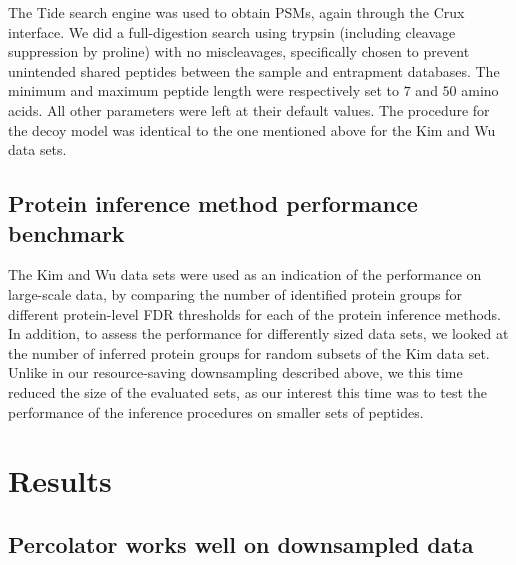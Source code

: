 \documentclass{article}
\begin{document}

The Tide search engine was used to obtain PSMs, again through the Crux 
interface. We did a full-digestion search using trypsin (including 
cleavage suppression by proline) with no miscleavages, specifically 
chosen to prevent unintended shared peptides between the sample and 
entrapment databases. The minimum and maximum peptide length were 
respectively set to $7$ and $50$ amino acids. All other parameters 
were left at their default values. The procedure for the decoy model 
was identical to the one mentioned above for the Kim and Wu data sets.

\subsection*{Protein inference method performance benchmark}

The Kim and Wu data sets were used as an indication of the performance 
on large-scale data, by comparing the number of identified protein 
groups for different protein-level FDR thresholds for each of the 
protein inference methods. In addition, to assess the performance for 
differently sized data sets, we looked at the number of inferred 
protein groups for random subsets of the Kim data set. Unlike in our 
resource-saving downsampling described above, we this time reduced the 
size of the evaluated sets, as our interest this time was to test the 
performance of the inference procedures on smaller sets of peptides.

\section*{Results}

\subsection*{Percolator works well on downsampled data}
\end{document}

